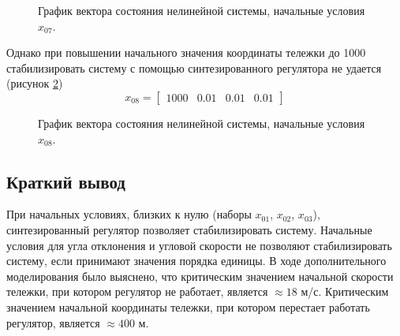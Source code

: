 \begin{figure}[!h]
\caption{График вектора состояния нелинейной системы, начальные условия $x_{07}$.}
\label{3_x_nlin_07_lg}
\end{figure}

Однако при повышении начального значения координаты тележки до 1000 стабилизировать систему с помощью синтезированного регулятора не удается (рисунок \ref{3_x_nlin_08_lg})
$$x_{08} = \begin{bmatrix}
    1000 & 0.01 & 0.01 & 0.01
\end{bmatrix}$$

\begin{figure}[!h]
\caption{График вектора состояния нелинейной системы, начальные условия $x_{08}$.}
\label{3_x_nlin_08_lg}
\end{figure}

\newpage
\subsection{Краткий вывод}
При начальных условиях, близких к нулю (наборы $x_{01}$, $x_{02}$, $x_{03}$), синтезированный регулятор позволяет стабилизировать систему. Начальные условия для угла отклонения и угловой скорости не позволяют стабилизировать систему, если принимают значения порядка единицы. В ходе дополнительного моделирования было выяснено, что критическим значением начальной скорости тележки, при котором регулятор не работает, является $\approx 18$ м/с. Критическим значением начальной координаты тележки, при котором перестает работать регулятор, является $\approx 400$ м. 


